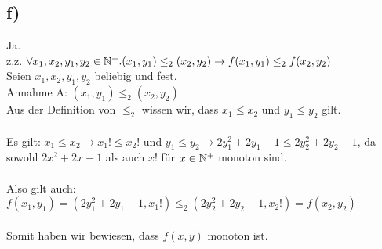 \subsection*{f)}
Ja.\\
z.z. $\forall x_1, x_2, y_1, y_2 \in \mathbb{N}^{+}.(x_1, y_1) \leq_2 (x_2, y_2) \rightarrow f(x_1, y_1) \leq_2 f(x_2, y_2)$\\
Seien $x_1, x_2, y_1, y_2$ beliebig und fest.\\
Annahme A: $(x_1, y_1) \leq_2 (x_2, y_2)$\\
Aus der Definition von $\leq_2$ wissen wir, dass $x_1 \leq x_2$ und $y_1 \leq y_2$ gilt.\\\\
Es gilt: $x_1 \leq x_2 \rightarrow x_1! \leq x_2!$ und $y_1 \leq y_2 \rightarrow 2y_1^2+2y_1-1 \leq 2y_2^2+2y_2-1$, da sowohl $2x^2+2x-1$ als auch $x!$ f\"ur $x \in \mathbb{N}^{+}$ monoton sind.\\\\
Also gilt auch: $f(x_1, y_1) = (2y_1^2+2y_1-1, x_1!) \leq_2 (2y_2^2+2y_2-1, x_2!) = f(x_2, y_2)$\\\\
Somit haben wir bewiesen, dass $f(x, y)$ monoton ist.
